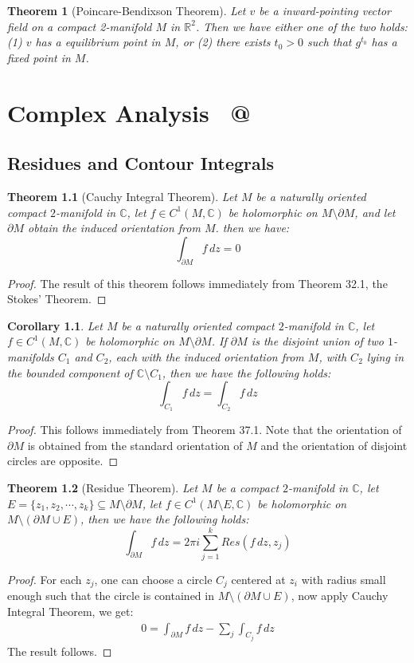 \documentclass[11pt,oneside]{book}
\makeatletter
\theoremstyle{break}
\theoremstyle{break}
\newtheorem{thm}{Theorem}[section]
\newtheorem{corT}[lem]{Corollary}
\newcommand{\R}{\mathbb{R}}
\newcommand{\Complex}{\mathbb{C}}
\newcommand*{\rom}[1]{\expandafter\@slowromancap\romannumeral #1@}
\makeatother
\begin{document}
\begin{thm}[Poincare-Bendixson Theorem]
Let $v$ be a inward-pointing vector field on a compact 2-manifold $M$ in $\R^2$. Then we have either one of the two holds: (1) $v$ has a equilibrium point in $M$, or (2) there exists $t_0 > 0$ such that $g^{t_0}$ has a fixed point in $M$. 
\end{thm}


\newpage
\chapter{Complex Analysis \ \rom{2}}
\setcounter{section}{36}
\section[Residues and Contour Integrals]{\color{red}Residues and Contour Integrals\color{black}}
\begin{thm}[Cauchy Integral Theorem]
Let $M$ be a naturally oriented compact $2$-manifold in $\Complex$, let $f \in C^1(M, \Complex)$ be holomorphic on $M \setminus \partial M$, and let $\partial M$ obtain the induced orientation from $M$. then we have: 
$$\int_{\partial M}f\, dz = 0$$ 
\end{thm}
\begin{proof}
The result of this theorem follows immediately from Theorem 32.1, the Stokes' Theorem.
\end{proof}

\begin{corT}
Let $M$ be a naturally oriented compact $2$-manifold in $\Complex$, let $f \in C^1 ( M,\Complex)$ be holomorphic on $M\setminus \partial M$. If $\partial M$ is the disjoint union of two $1$-manifolds $C_1$ and $C_2$, each with the induced orientation from $M$, with $C_2$ lying in the bounded component of $\Complex \setminus C_1$, then we have the following holds:
$$\int_{C_1}f \, dz = \int_{C_2} f\, dz$$
\end{corT}
\begin{proof}
This follows immediately from Theorem 37.1. Note that the orientation of $\partial M$ is obtained from the standard orientation of $M$ and the orientation of disjoint circles are opposite.
\end{proof}


\begin{thm}[Residue Theorem]
Let $M$ be a compact $2$-manifold in $\Complex$, let $E = \{z_1,z_2,\cdots, z_k\} \subseteq M\setminus \partial M$, let $f\in C^1(M\setminus E, \Complex)$ be holomorphic on $M \setminus (\partial M\cup E)$, then we have the following holds:
$$\int_{\partial M}f\, dz = 2\pi i \sum_{j=1}^k Res(f\, dz, z_j)$$ 
\end{thm}
\begin{proof}
For each $z_j$, one can choose a circle $C_j$ centered at $z_i$ with radius small enough such that the circle is contained in $M\setminus (\partial M\cup E)$, now apply Cauchy Integral Theorem, we get:
\begin{align*}
0 = \int_{\partial M}f\, dz - \sum_j \int_{C_j}f\, dz
\end{align*}
The result follows.
\end{proof}
\end{document}

